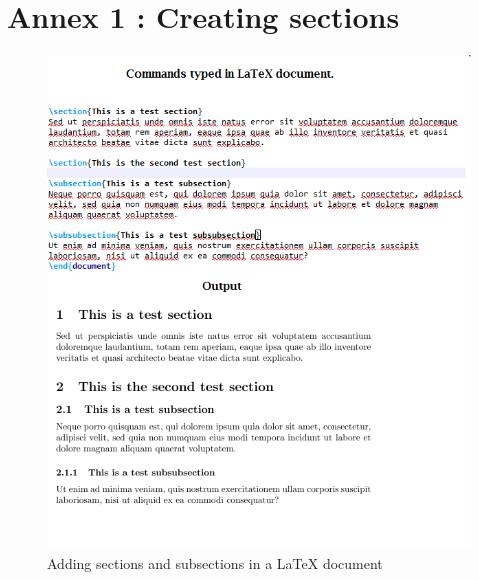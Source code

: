 \documentclass[12pts]{report}
\begin{document}
\newpage
\section*{Annex 1 : Creating sections}
\label{sec:Annex}
\begin{figure}[H]
	\centering
	\includegraphics[width=0.7\linewidth]{../img/section}
	\caption{Adding sections and subsections in a {\LaTeX} document}
	\label{fig:adding sections}
\end{figure}
\end{document}
